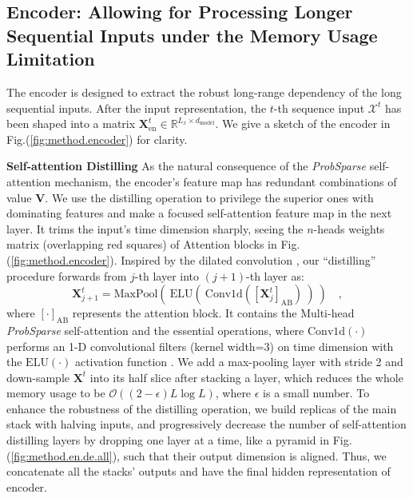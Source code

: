 \documentclass[letterpaper]{article} %
\newcommand{\mb}{\mathbf}
\newcommand{\bigO}{\mathcal{O}}
\begin{document}
\subsection{Encoder: Allowing for Processing Longer Sequential Inputs under the Memory Usage Limitation}
\label{sec:method.transformer.encoder}
The encoder is designed to extract the robust long-range dependency of the long sequential inputs.
After the input representation, the $t$-th sequence input $\mathcal{X}^t$ has been shaped into a matrix $\mb{X}^t_{\textrm{en}} \in \mathbb{R}^{L_x \times d_{\textrm{model}}}$. We give a sketch of the encoder in Fig.(\ref{fig:method.encoder}) for clarity.

\textbf{Self-attention Distilling} As the natural consequence of the \emph{ProbSparse} self-attention mechanism, the encoder's feature map has redundant combinations of value $\mb{V}$. We use the distilling operation to privilege the superior ones with dominating features and make a focused self-attention feature map in the next layer. It trims the input's time dimension sharply, seeing the $n$-heads weights matrix (overlapping red squares) of Attention blocks in Fig.(\ref{fig:method.encoder}). Inspired by the dilated convolution \cite{yu2017dilated, gupta2017dilated}, our ``distilling'' procedure forwards from $j$-th layer into $(j+1)$-th layer as:
\begin{equation}
\label{eq:method.distilling}
\mb{X}^t_{j+1}=
    \mathrm{MaxPool}\left(~
    \mathrm{ELU}(~
    \mathrm{Conv1d}(
    [\mb{X}^t_{j}]_{\mathrm{AB}}
    )~)~\right) \quad, 
\end{equation}
where $[\cdot]_{\text{{AB}}}$ represents the attention block. It contains the Multi-head \emph{ProbSparse} self-attention and the essential operations, where $\textrm{Conv1d}(\cdot)$ performs an 1-D convolutional filters (kernel width=3) on time dimension with the $\textrm{ELU}(\cdot)$ activation function \cite{clevert2015fast}. We add a max-pooling layer with stride 2 and down-sample $\mb{X}^t$ into its half slice after stacking a layer, which reduces the whole memory usage to be $\bigO((2-\epsilon) L \log L)$, where $\epsilon$ is a small number. To enhance the robustness of the distilling operation, we build replicas of the main stack with halving inputs, and progressively decrease the number of self-attention distilling layers by dropping one layer at a time, like a pyramid in Fig.(\ref{fig:method.en.de.all}), such that their output dimension is aligned. Thus, we concatenate all the stacks' outputs and have the final hidden representation of encoder.
\end{document}
